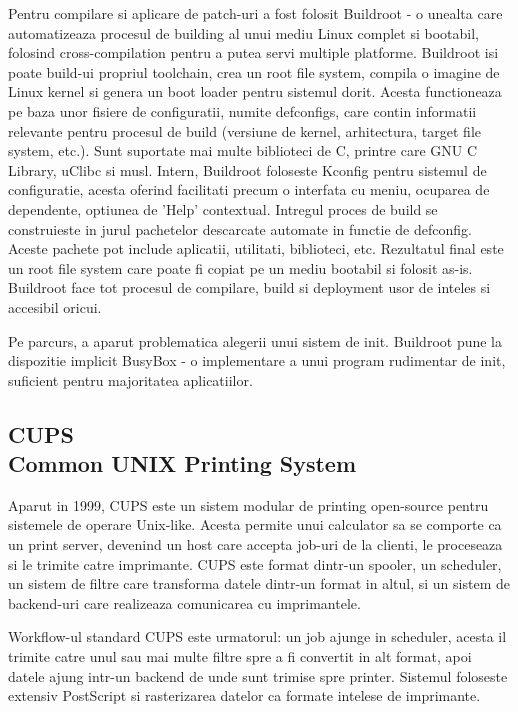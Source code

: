 \documentclass[12pt]{report}
\begin{document}
Pentru compilare si aplicare de patch-uri a fost folosit Buildroot - o unealta care automatizeaza procesul de building al unui mediu Linux complet si bootabil, folosind cross-compilation pentru a putea servi multiple platforme. Buildroot isi poate build-ui propriul toolchain, crea un root file system, compila o imagine de Linux kernel si genera un boot loader pentru sistemul dorit. Acesta functioneaza pe baza unor fisiere de configuratii, numite defconfigs, care contin informatii relevante pentru procesul de build (versiune de kernel, arhitectura, target file system, etc.). Sunt suportate mai multe biblioteci de C, printre care GNU C Library, uClibc si musl. Intern, Buildroot foloseste Kconfig pentru sistemul de configuratie, acesta oferind facilitati precum o interfata cu meniu, ocuparea de dependente, optiunea de 'Help' contextual. Intregul proces de build se construieste in jurul pachetelor descarcate automate in functie de defconfig. Aceste pachete pot include aplicatii, utilitati, biblioteci, etc. Rezultatul final este un root file system care poate fi copiat pe un mediu bootabil si folosit as-is. Buildroot face tot procesul de compilare, build si deployment usor de inteles si accesibil oricui. 

Pe parcurs, a aparut problematica alegerii unui sistem de init. Buildroot pune la dispozitie implicit BusyBox - o implementare a unui program rudimentar de init, suficient pentru majoritatea aplicatiilor.
		\subsection[CUPS]{CUPS\\ {\normalsize Common UNIX Printing System}}
Aparut in 1999, CUPS este un sistem modular de printing open-source pentru sistemele de operare Unix-like. Acesta permite unui calculator sa se comporte ca un print server, devenind un host care accepta job-uri de la clienti, le proceseaza si le trimite catre imprimante.
CUPS este format dintr-un spooler, un scheduler, un sistem de filtre care transforma datele dintr-un format in altul, si un sistem de backend-uri care realizeaza comunicarea cu imprimantele.

Workflow-ul standard CUPS este urmatorul: un job ajunge in scheduler, acesta il trimite catre unul sau mai multe filtre spre a fi convertit in alt format, apoi datele ajung intr-un backend de unde sunt trimise spre printer. Sistemul foloseste extensiv PostScript si rasterizarea datelor ca formate intelese de imprimante.
\end{document}
